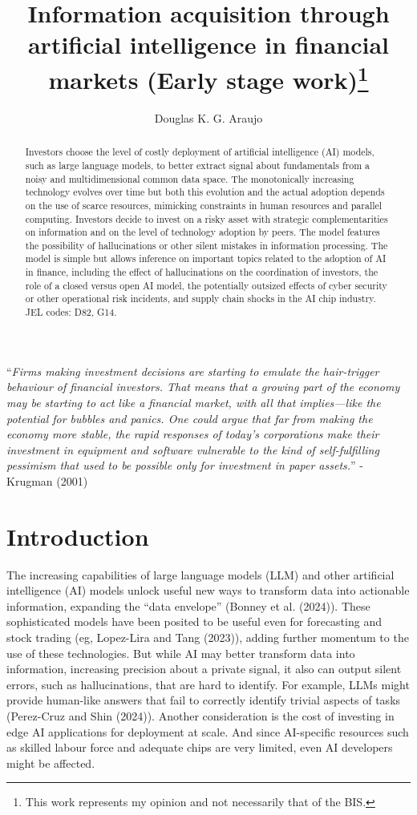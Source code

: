 \documentclass[
]{article}
\title{Information acquisition through artificial intelligence in
financial markets (Early stage work)\thanks{This work represents my
opinion and not necessarily that of the BIS.}}
\author{Douglas K. G. Araujo}
\affil{%
                  Bank for International
Settlements, douglas.araujo@bis.org
              }
\date{}
\theoremstyle{plain}
\theoremstyle{remark}
\begin{document}
\maketitle
\begin{abstract}
Investors choose the level of costly deployment of artificial
intelligence (AI) models, such as large language models, to better
extract signal about fundamentals from a noisy and multidimensional
common data space. The monotonically increasing technology evolves over
time but both this evolution and the actual adoption depends on the use
of scarce resources, mimicking constraints in human resources and
parallel computing. Investors decide to invest on a risky asset with
strategic complementarities on information and on the level of
technology adoption by peers. The model features the possibility of
hallucinations or other silent mistakes in information processing. The
model is simple but allows inference on important topics related to the
adoption of AI in finance, including the effect of hallucinations on the
coordination of investors, the role of a closed versus open AI model,
the potentially outsized effects of cyber security or other operational
risk incidents, and supply chain shocks in the AI chip industry. JEL
codes: D82, G14.
\end{abstract}

``\emph{Firms making investment decisions are starting to emulate the
hair-trigger behaviour of financial investors. That means that a growing
part of the economy may be starting to act like a financial market, with
all that implies---like the potential for bubbles and panics. One could
argue that far from making the economy more stable, the rapid responses
of today's corporations make their investment in equipment and software
vulnerable to the kind of self-fulfilling pessimism that used to be
possible only for investment in paper assets.}'' - Krugman (2001)

\section{Introduction}\label{introduction}

The increasing capabilities of large language models (LLM) and other
artificial intelligence (AI) models unlock useful new ways to transform
data into actionable information, expanding the ``data envelope''
(Bonney et al. (2024)). These sophisticated models have been posited to
be useful even for forecasting and stock trading (eg, Lopez-Lira and
Tang (2023)), adding further momentum to the use of these technologies.
But while AI may better transform data into information, increasing
precision about a private signal, it also can output silent errors, such
as hallucinations, that are hard to identify. For example, LLMs might
provide human-like answers that fail to correctly identify trivial
aspects of tasks (Perez-Cruz and Shin (2024)). Another consideration is
the cost of investing in edge AI applications for deployment at scale.
And since AI-specific resources such as skilled labour force and
adequate chips are very limited, even AI developers might be affected.
\end{document}
